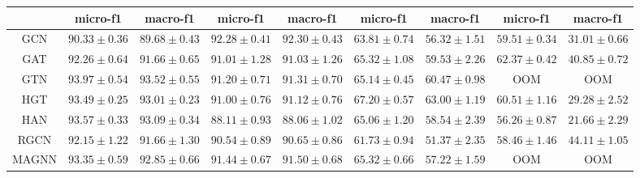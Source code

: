 \begin{table*}[!t]
{\begin{tabular}{c|cc|cc|cc|cc}
		& micro-f1   & macro-f1   & micro-f1     & macro-f1 
            & micro-f1   & macro-f1   & micro-f1     & macro-f1\\
		\midrule
         GCN       & $90.33 \pm 0.36$    
            & $89.68 \pm 0.43$    
            & $92.28 \pm 0.41$
		  & $92.30 \pm 0.43$                
            & $63.81 \pm 0.74$  
            & $56.32 \pm 1.51$
            & $59.51 \pm 0.34$
            & $31.01 \pm 0.66$
		\\
  GAT       & $92.26 \pm 0.64$    
            & $91.66 \pm 0.65$    
            & $91.01 \pm 1.28$
		  & $91.03 \pm 1.26$                
            & $65.32 \pm 1.08$  
            & $59.53 \pm 2.26$
            & $62.37 \pm 0.42$
            & $40.85 \pm 0.72$
		\\
    GTN     & $93.97 \pm 0.54$    
            & $93.52 \pm 0.55$    
            & $91.20 \pm 0.71$
		  & $91.31 \pm 0.70$                
            & $65.14 \pm 0.45$  
            & $60.47 \pm 0.98$
            & OOM
            & OOM
		\\
    HGT     & $93.49 \pm 0.25$    
            & $93.01 \pm 0.23$    
            & $91.00 \pm 0.76$
		  & $91.12 \pm 0.76$                
            & $67.20 \pm 0.57$  
            & $63.00 \pm 1.19$
            & $60.51 \pm 1.16$
            & $29.28 \pm 2.52$
		\\
		HAN & $93.57 \pm 0.33$    
            & $93.09 \pm 0.34$    
            & $88.11 \pm 0.93$
		  & $88.06 \pm 1.02$                
            & $65.06 \pm 1.20$  
            & $58.54 \pm 2.39$
            & $56.26 \pm 0.87$
            & $21.66 \pm 2.29$
		\\
        RGCN & $92.15 \pm 1.22$    
            & $91.66 \pm 1.30$    
            & $90.54 \pm 0.89$
		  & $90.65 \pm 0.86$                
            & $61.73 \pm 0.94$  
            & $51.37 \pm 2.35$
            & $58.46 \pm 1.46$
            & $44.11 \pm 1.05$
		\\
  MAGNN     & $93.35 \pm 0.59$    
            & $92.85 \pm 0.66$    
            & $91.44 \pm 0.67$
		  & $91.50 \pm 0.68$                
            & $65.32 \pm 0.66$  
            & $57.22 \pm 1.59$
            & OOM
            & OOM
		\\
  

\end{tabular}}
\end{table*}
